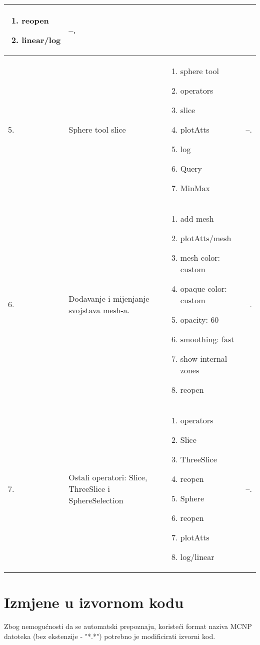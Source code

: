\documentclass[times, utf8, zavrsni]{fer}
\begin{document}
\begin{longtable}{|l|p{80pt}|p{100pt}|p{120pt}|}
\begin{enumerate}
    \item reopen
    \item linear/log
\end{enumerate}
& --.\\
\hline
5. & Sphere tool slice & \begin{enumerate}
	\item sphere tool    
    \item operators
    \item slice
    \item plotAtts
    \item log
    \item Query
    \item MinMax
\end{enumerate}
& --.\\
\hline
6. & Dodavanje i mijenjanje svojstava mesh-a. & \begin{enumerate}
	\item add mesh
	\item plotAtts/mesh
	\item mesh color: custom
	\item opaque color: custom
	\item opacity: 60%
	\item smoothing: fast
	\item show internal zones
	\item reopen
\end{enumerate}
& --.\\
\hline
7. & Ostali operatori: Slice, ThreeSlice i SphereSelection & \begin{enumerate}
	\item operators
	\item Slice
	\item ThreeSlice
	\item reopen
	\item Sphere
	\item reopen
	\item plotAtts
	\item log/linear
\end{enumerate}
& --.\\
\hline
\end{longtable}
	
\section{Izmjene u izvornom kodu}
Zbog nemogućnosti da se automatski prepoznaju, koristeći format naziva MCNP datoteka (bez ekstenzije - "*.*") potrebno je modificirati izvorni kod.
\end{document}
